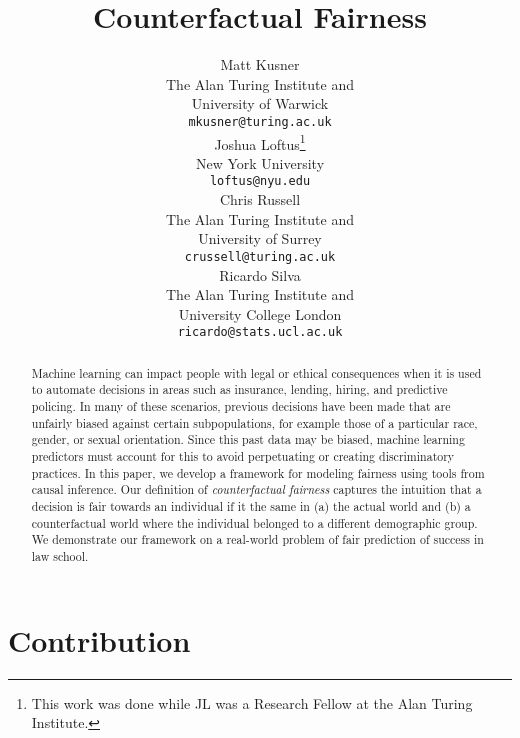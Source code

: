 \documentclass{article}
\title{Counterfactual Fairness}
\author{
  Matt Kusner\\
  The Alan Turing Institute and \\
  University of Warwick \\
  \texttt{mkusner@turing.ac.uk} \\
  \And
  Joshua Loftus\thanks{This work was done while JL
     was a Research Fellow at the Alan Turing Institute.} \\
  New York University\\
  \texttt{loftus@nyu.edu} \\
  \And
  Chris Russell \\
  The Alan Turing Institute and \\
  University of Surrey\\
  \texttt{crussell@turing.ac.uk} \\
  \And
  Ricardo Silva \\
  The Alan Turing Institute and \\
  University College London\\
  \texttt{ricardo@stats.ucl.ac.uk} \\
}
\begin{document}
\maketitle




\begin{abstract} 
  Machine learning can impact people with legal or ethical
  consequences when it is used
  to automate decisions in areas such as insurance, lending, hiring,
  and predictive policing.  In many of these scenarios,
  previous decisions have been made that are unfairly biased against
  certain subpopulations, for example those of a particular race, gender, or
  sexual orientation.  Since this past data may be biased,
  machine learning predictors must account for this to avoid
  perpetuating or creating discriminatory practices.
  In this paper, we develop a framework for modeling fairness
  using tools from causal inference. Our definition of
  \emph{counterfactual fairness} captures the
  intuition that a decision is fair towards an individual if it 
  the same in (a) the actual world and (b) a counterfactual world
  where the individual belonged to a different demographic
  group. We demonstrate our framework on a real-world problem of fair
  prediction of success in law school.
\end{abstract} 

\section{Contribution}
\label{sec:introduction}

\end{document}

